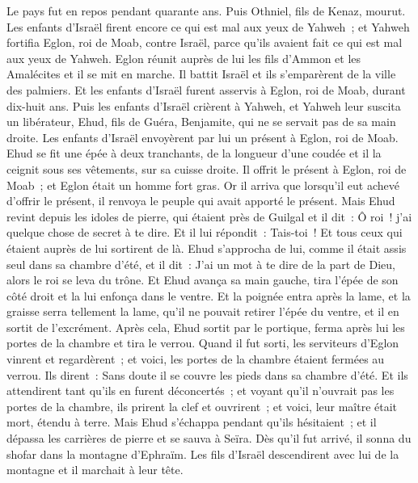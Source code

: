 \begin{multicols}{2}
Le pays fut en repos pendant quarante ans. Puis Othniel, fils de Kenaz, mourut.
Les enfants d'Israël firent encore ce qui est mal aux yeux de Yahweh~; et Yahweh fortifia Eglon, roi de Moab, contre Israël, parce qu'ils avaient fait ce qui est mal aux yeux de Yahweh.
Eglon réunit auprès de lui les fils d'Ammon et les Amalécites et il se mit en marche. Il battit Israël et ils s'emparèrent de la ville des palmiers.
Et les enfants d'Israël furent asservis à Eglon, roi de Moab, durant dix-huit ans.
Puis les enfants d'Israël crièrent à Yahweh, et Yahweh leur suscita un libérateur, Ehud, fils de Guéra, Benjamite, qui ne se servait pas de sa main droite. Les enfants d'Israël envoyèrent par lui un présent à Eglon, roi de Moab.
Ehud se fit une épée à deux tranchants, de la longueur d'une coudée et il la ceignit sous ses vêtements, sur sa cuisse droite.
Il offrit le présent à Eglon, roi de Moab~; et Eglon était un homme fort gras.
Or il arriva que lorsqu'il eut achevé d'offrir le présent, il renvoya le peuple qui avait apporté le présent.
Mais Ehud revint depuis les idoles de pierre, qui étaient près de Guilgal et il dit~: Ô roi~! j'ai quelque chose de secret à te dire. Et il lui répondit~: Tais-toi~! Et tous ceux qui étaient auprès de lui sortirent de là.
Ehud s'approcha de lui, comme il était assis seul dans sa chambre d'été, et il dit~: J'ai un mot à te dire de la part de Dieu, alors le roi se leva du trône.
Et Ehud avança sa main gauche, tira l'épée de son côté droit et la lui enfonça dans le ventre.
Et la poignée entra après la lame, et la graisse serra tellement la lame, qu'il ne pouvait retirer l'épée du ventre, et il en sortit de l'excrément.
Après cela, Ehud sortit par le portique, ferma après lui les portes de la chambre et tira le verrou.
Quand il fut sorti, les serviteurs d'Eglon vinrent et regardèrent~; et voici, les portes de la chambre étaient fermées au verrou. Ils dirent~: Sans doute il se couvre les pieds dans sa chambre d'été.
Et ils attendirent tant qu'ils en furent déconcertés~; et voyant qu'il n'ouvrait pas les portes de la chambre, ils prirent la clef et ouvrirent~; et voici, leur maître était mort, étendu à terre.
Mais Ehud s'échappa pendant qu'ils hésitaient~; et il dépassa les carrières de pierre et se sauva à Seïra.
Dès qu'il fut arrivé, il sonna du shofar dans la montagne d'Ephraïm. Les fils d'Israël descendirent avec lui de la montagne et il marchait à leur tête.

\end{multicols}
